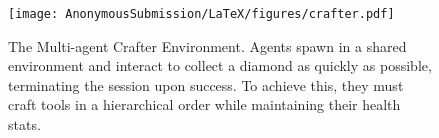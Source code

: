 \begin{figure}[h]
  \centering
  \texttt{[image: AnonymousSubmission/LaTeX/figures/crafter.pdf]}
  \caption{The Multi-agent Crafter Environment. Agents spawn in a shared environment and interact to collect a diamond as quickly as possible, terminating the session upon success. To achieve this, they must craft tools in a hierarchical order while maintaining their health stats.}
  \label{fig:crafter}
\end{figure}




